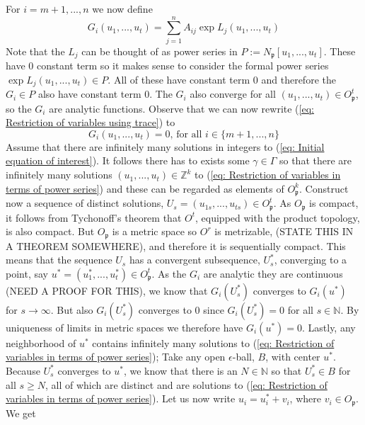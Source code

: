 \documentclass{article}
\newcommand{\mfrak}[1]{\mathfrak{#1}}
\newcommand{\mbb}[1]{\mathbb{#1}}
\begin{document}

For $i = m+1, ..., n$ we now define
$$G_i(u_1, ..., u_t) = \sum_{j = 1}^n A_{ij} \exp L_j(u_1, ..., u_t) $$
Note that the $L_j$ can be thought of as power series in $P := N_\mfrak{p}[u_1, ..., u_t]$. These have 0 constant term so it makes sense to consider the formal power series $\exp L_j(u_1, ..., u_t) \in P$. All of these have constant term 0 and therefore the $G_i \in P$ also have constant term 0. The $G_i$ also converge for all $(u_1, ..., u_t) \in O_\mfrak p^t$, so the $G_i$ are analytic functions. Observe that we can now rewrite (\ref{eq: Restriction of variables using trace}) to
\begin{equation}\label{eq: Restriction of variables in terms of power series}\tag{\textdagger\textdagger\textdagger}
    G_i(u_1, ..., u_t) = 0 \text{, for all } i \in \{m+1, ..., n\}
\end{equation}
Assume that there are infinitely many solutions in integers to (\ref{eq: Initial equation of interest}). It follows there has to exists some $\gamma \in \Gamma$ so that there are infinitely many solutions $(u_1, ..., u_t) \in \mbb Z^k$ to (\ref{eq: Restriction of variables in terms of power series}) and these can be regarded as elements of $O_{\mfrak p}^k$. Construct now a sequence of distinct solutions, $U_s = (u_{1s}, ..., u_{ts}) \in O_\mfrak p^t$. As $O_\mfrak p$ is compact, it follows from Tychonoff's theorem that $O^t$, equipped with the product topology, is also compact. But $O_\mfrak p$ is a metric space so $O^r$ is metrizable, (STATE THIS IN A THEOREM SOMEWHERE), and therefore it is sequentially compact. This means that the sequence $U_s$ has a convergent subsequence, $U^*_s$, converging to a point, say $u^* = (u_1^*, ..., u_t^*) \in O_{\mfrak p}^t$. As the $G_i$ are analytic they are continuous (NEED A PROOF FOR THIS), we know that $G_i(U^*_s)$ converges to $G_i(u^*)$ for $s \to \infty$. But also $G_i(U^*_s)$ converges to 0 since $G_i(U^*_s) = 0$ for all $s \in \mbb N$. By uniqueness of limits in metric spaces we therefore have $G_i(u^*) = 0$. Lastly, any neighborhood of $u^*$ contains infinitely many solutions to (\ref{eq: Restriction of variables in terms of power series}); Take any open $\epsilon$-ball, $B$, with center $u^*$. Because $U^*_s$ converges to $u^*$, we know that there is an $N \in \mbb N$ so that $U^*_s \in B$ for all $s \geq N$, all of which are distinct and are solutions to (\ref{eq: Restriction of variables in terms of power series}). Let us now write $u_i = u_i^* + v_i$, where $v_i \in O_\mfrak p$. We get
\end{document}
